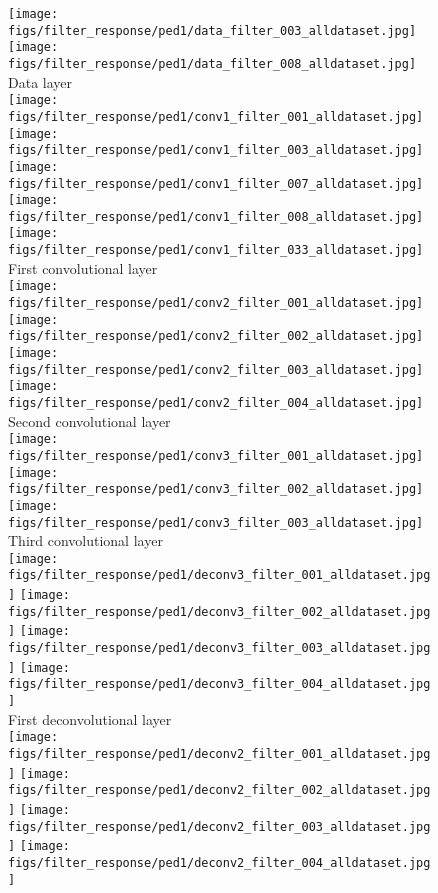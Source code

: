 \documentclass[10pt,twocolumn,letterpaper]{article}
\begin{document}
\begin{figure}[h]
	\centering
	\texttt{[image: figs/filter\_response/ped1/data\_filter\_003\_alldataset.jpg]}
	\texttt{[image: figs/filter\_response/ped1/data\_filter\_008\_alldataset.jpg]}\\
	{\footnotesize Data layer}\\
	\texttt{[image: figs/filter\_response/ped1/conv1\_filter\_001\_alldataset.jpg]}
	\texttt{[image: figs/filter\_response/ped1/conv1\_filter\_003\_alldataset.jpg]}
	\texttt{[image: figs/filter\_response/ped1/conv1\_filter\_007\_alldataset.jpg]}
	\texttt{[image: figs/filter\_response/ped1/conv1\_filter\_008\_alldataset.jpg]}
	\texttt{[image: figs/filter\_response/ped1/conv1\_filter\_033\_alldataset.jpg]}\\
	{\footnotesize First convolutional layer}\\
	\texttt{[image: figs/filter\_response/ped1/conv2\_filter\_001\_alldataset.jpg]}
	\texttt{[image: figs/filter\_response/ped1/conv2\_filter\_002\_alldataset.jpg]}
	\texttt{[image: figs/filter\_response/ped1/conv2\_filter\_003\_alldataset.jpg]}
	\texttt{[image: figs/filter\_response/ped1/conv2\_filter\_004\_alldataset.jpg]}\\
	{\footnotesize Second convolutional layer}\\
	\texttt{[image: figs/filter\_response/ped1/conv3\_filter\_001\_alldataset.jpg]}
	\texttt{[image: figs/filter\_response/ped1/conv3\_filter\_002\_alldataset.jpg]}
	\texttt{[image: figs/filter\_response/ped1/conv3\_filter\_003\_alldataset.jpg]}\\
	{\footnotesize Third convolutional layer}\\
	\texttt{[image: figs/filter\_response/ped1/deconv3\_filter\_001\_alldataset.jpg]}
	\texttt{[image: figs/filter\_response/ped1/deconv3\_filter\_002\_alldataset.jpg]}
	\texttt{[image: figs/filter\_response/ped1/deconv3\_filter\_003\_alldataset.jpg]}
	\texttt{[image: figs/filter\_response/ped1/deconv3\_filter\_004\_alldataset.jpg]}\\
	{\footnotesize First deconvolutional layer}\\
	\texttt{[image: figs/filter\_response/ped1/deconv2\_filter\_001\_alldataset.jpg]}
	\texttt{[image: figs/filter\_response/ped1/deconv2\_filter\_002\_alldataset.jpg]}
	\texttt{[image: figs/filter\_response/ped1/deconv2\_filter\_003\_alldataset.jpg]}
	\texttt{[image: figs/filter\_response/ped1/deconv2\_filter\_004\_alldataset.jpg]}

\end{figure}
\end{document}
